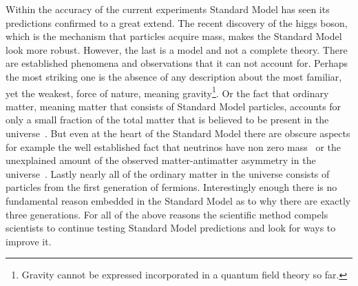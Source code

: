 Within the accuracy of the current experiments Standard Model has seen its predictions confirmed to a great extend.
The recent discovery of the higgs boson, which is the mechanism that particles acquire mass, makes the Standard Model look
more robust. However, the last is a model and not a complete theory. There are established phenomena and observations that it can not
account for. Perhaps the most striking one is the absence of any description about the most familiar, yet the weakest, force of nature,
meaning gravity\footnote{Gravity cannot be expressed incorporated in a quantum field theory so far.}.
Or the fact that ordinary matter, meaning matter that consists of Standard Model particles, accounts for only a small fraction of the total matter
that is believed to be present in the universe~\cite{dmatter-Hinshaw}. But even at the heart of the Standard Model there are obscure aspects for example the well established fact
that neutrinos have non zero mass~\cite{nu-mass-superkam,nu-mass-kamland,nu-mass-sno,nu-mass-daya} or the unexplained amount of the observed
matter-antimatter asymmetry in the universe~\cite{more-cpv-huet,more-cpv-gavela_I,more-cpv-gavela_II}.
Lastly nearly all of the ordinary matter in the universe consists of
particles from the first generation of fermions. Interestingly enough there is no fundamental reason embedded in the Standard Model
as to why there are exactly three generations. For all of the above reasons the scientific method compels scientists to continue
testing Standard Model predictions and look for ways to improve it.
